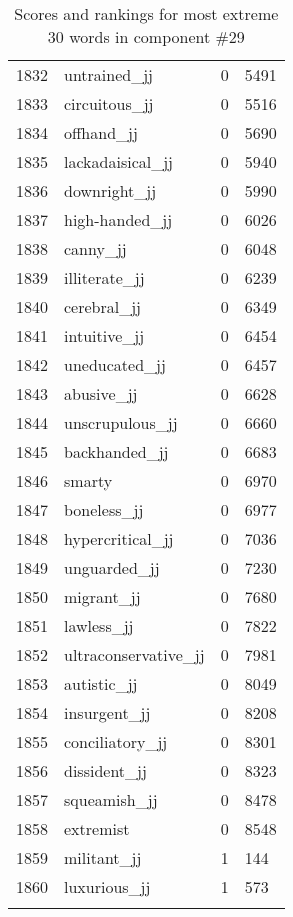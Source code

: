 \begin{longtable}[!htbp]{| rlr@{.}l |}
    1832 & untrained\_jj & 0 & 5491 \\
    1833 & circuitous\_jj & 0 & 5516 \\
    1834 & offhand\_jj & 0 & 5690 \\
    1835 & lackadaisical\_jj & 0 & 5940 \\
    1836 & downright\_jj & 0 & 5990 \\
    1837 & high-handed\_jj & 0 & 6026 \\
    1838 & canny\_jj & 0 & 6048 \\
    1839 & illiterate\_jj & 0 & 6239 \\
    1840 & cerebral\_jj & 0 & 6349 \\
    1841 & intuitive\_jj & 0 & 6454 \\
    1842 & uneducated\_jj & 0 & 6457 \\
    1843 & abusive\_jj & 0 & 6628 \\
    1844 & unscrupulous\_jj & 0 & 6660 \\
    1845 & backhanded\_jj & 0 & 6683 \\
    1846 & smarty & 0 & 6970 \\
    1847 & boneless\_jj & 0 & 6977 \\
    1848 & hypercritical\_jj & 0 & 7036 \\
    1849 & unguarded\_jj & 0 & 7230 \\
    1850 & migrant\_jj & 0 & 7680 \\
    1851 & lawless\_jj & 0 & 7822 \\
    1852 & ultraconservative\_jj & 0 & 7981 \\
    1853 & autistic\_jj & 0 & 8049 \\
    1854 & insurgent\_jj & 0 & 8208 \\
    1855 & conciliatory\_jj & 0 & 8301 \\
    1856 & dissident\_jj & 0 & 8323 \\
    1857 & squeamish\_jj & 0 & 8478 \\
    1858 & extremist & 0 & 8548 \\
    1859 & militant\_jj & 1 & 144 \\
    1860 & luxurious\_jj & 1 & 573 \\
    \hline
    \caption{Scores and rankings for most extreme 30 words in component \#29} \\
\end{longtable}
